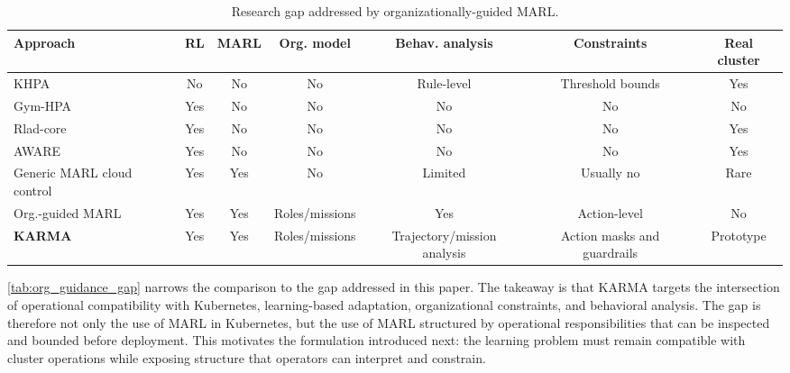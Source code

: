 \documentclass[journal]{IEEEtran}
\begin{document}
\begin{table}[t]
  \centering
  \caption{Research gap addressed by organizationally-guided MARL.}
  \label{tab:org_guidance_gap}
  \scriptsize
  \setlength{\tabcolsep}{3.4pt}
  \renewcommand{\arraystretch}{1.05}
  \begin{tabular}{lcccccc}
    \toprule
    \textbf{Approach}                          & \textbf{RL} & \textbf{MARL} & \textbf{Org. model} & \textbf{Behav. analysis}    & \textbf{Constraints}        & \textbf{Real cluster} \\
    \midrule
    KHPA                                       & No          & No            & No                  & Rule-level                  & Threshold bounds            & Yes                   \\
    Gym-HPA~\cite{gymhpa2022}                  & Yes         & No            & No                  & No                          & No                          & No                    \\
    Rlad-core~\cite{Rossi2019}                 & Yes         & No            & No                  & No                          & No                          & Yes                   \\
    AWARE~\cite{aware2023}                     & Yes         & No            & No                  & No                          & No                          & Yes                   \\
    Generic MARL cloud control                 & Yes         & Yes           & No                  & Limited                     & Usually no                  & Rare                  \\
    Org.-guided MARL~\cite{soule2025moisemarl} & Yes         & Yes           & Roles/missions      & Yes                         & Action-level                & No                    \\
    \textbf{KARMA}                             & Yes         & Yes           & Roles/missions      & Trajectory/mission analysis & Action masks and guardrails & Prototype             \\
    \bottomrule
  \end{tabular}
\end{table}

\autoref{tab:org_guidance_gap} narrows the comparison to the gap addressed in this paper. The takeaway is that KARMA targets the intersection of operational compatibility with Kubernetes, learning-based adaptation, organizational constraints, and behavioral analysis. The gap is therefore not only the use of MARL in Kubernetes, but the use of MARL structured by operational responsibilities that can be inspected and bounded before deployment. This motivates the formulation introduced next: the learning problem must remain compatible with cluster operations while exposing structure that operators can interpret and constrain.
\end{document}

